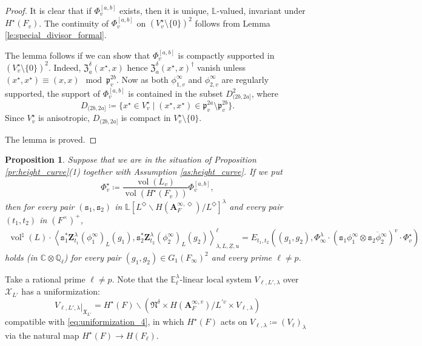 \documentclass[12pt]{amsart}
\numberwithin{equation}{section}
\theoremstyle{plain}
\newtheorem{proposition}{Proposition}[section]
\theoremstyle{definition}
\theoremstyle{remark}
\renewcommand{\b}[1]{\mathbf{#1}}
\renewcommand{\c}[1]{\mathcal{#1}}
\renewcommand{\d}[1]{\mathbb{#1}}
\newcommand{\f}[1]{\mathfrak{#1}}
\renewcommand{\(}{\left(}
\renewcommand{\)}{\right)}
\newcommand{\res}{\mathbin{|}}
\newcommand{\ol}[1]{\overline{#1}{}}
\newcommand{\ul}{\underline}
\newcommand{\bA}{\b A}
\newcommand{\cX}{\c X}
\newcommand{\dC}{\d C}
\newcommand{\dE}{\d E}
\newcommand{\dL}{\d L}
\newcommand{\dQ}{\d Q}
\newcommand{\fN}{\f N}
\newcommand{\fX}{\f X}
\newcommand{\fZ}{\f Z}
\newcommand{\fp}{\f p}
\newcommand{\ts}{\mathtt{s}}
\newcommand{\bbZ}{\boldsymbol{Z}}
\newcommand{\llangle}{\left\langle}
\newcommand{\rrangle}{\right\rangle}
\DeclareMathOperator{\vol}{vol}
\begin{document}
\begin{proof}
It is clear that if $\Phi^{[a,b]}_v$ exists, then it is unique, $\dL$-valued, invariant under $H^\star(F_v)$. The continuity of $\Phi^{[a,b]}_v$ on $(V^\star_v\setminus\{0\})^2$ follows from Lemma \ref{le:special_divisor_formal}.

The lemma follows if we can show that $\Phi^{[a,b]}_v$ is compactly supported in $(V^\star_v\setminus\{0\})^2$. Indeed, $\fZ_a^\delta(x^\star,x)$ hence $\fZ_a^\delta(x^\star,x)^\dag$ vanish unless $(x^\star,x^\star)\equiv(x,x)\mod\fp_v^{2b}$. Now as both $\phi^\infty_{1,v}$ and $\phi^\infty_{2,v}$ are regularly supported, the support of $\Phi^{[a,b]}_v$ is contained in the subset $D_{(2b,2a]}^2$, where
\[
D_{(2b,2a]}\coloneqq\{x^\star\in V^\star_v\res (x^\star,x^\star)\in\fp_v^{2a}\setminus\fp_v^{2b}\}.
\]
Since $V^\star_v$ is anisotropic, $D_{(2b,2a]}$ is compact in $V^\star_v\setminus\{0\}$.

The lemma is proved.
\end{proof}





\begin{proposition}\label{pr:height_curve_split}
Suppose that we are in the situation of Proposition \ref{pr:height_curve}(1) together with Assumption \ref{as:height_curve}.
If we put
\[
\Phi^\star_v\coloneqq\frac{\vol(L_v)}{\vol(H^\star(F_v))}\Phi^{[a,b]}_v,
\]
then for every pair $(\ts_1,\ts_2)$ in $\dL[L^\Diamond\backslash H(\bA_F^{\infty,\Diamond})/L^\Diamond]^\lambda$ and every pair $(t_1,t_2)$ in $(F^\times)^+$,
\begin{align*}
\vol^\natural(L)\cdot
\llangle\ts_1^*\bbZ^\lambda_{t_1}(\phi^\infty_1)_L(g_1),
\ts_2^*\bbZ^\lambda_{t_2}(\phi^\infty_2)_L(g_2)\rrangle_{\lambda,L,\ul{Z},u}^\ell
=E_{t_1,t_2}((g_1,g_2),\Phi^\lambda_\infty\cdot(\ts_1\phi^\infty_1\otimes\ol{\ts_2\phi^\infty_2})^v\cdot\Phi^\star_v)
\end{align*}
holds (in $\dC\otimes\dQ_\ell$) for every pair $(g_1,g_2)\in G_1(F_\infty)^2$ and every prime $\ell\neq p$.
\end{proposition}




Take a rational prime $\ell\neq p$. Note that the $\dE^\lambda_\ell$-linear local system $V_{\ell,L',\lambda}$ over $\cX_{L'}$ has a uniformization:
\[
V_{\ell,L',\lambda}\res_{\fX_{L'}}=H^\star(F)\backslash\(\fN^\delta\times H(\bA_F^{\infty,v})/L^{\prime v}\times V_{\ell,\lambda}\)
\]
compatible with \eqref{eq:uniformization_4}, in which $H^\star(F)$ acts on $V_{\ell,\lambda}\coloneqq(V_\ell)_\lambda$ via the natural map $H^\star(F)\to H(F_\ell)$.
\end{document}
